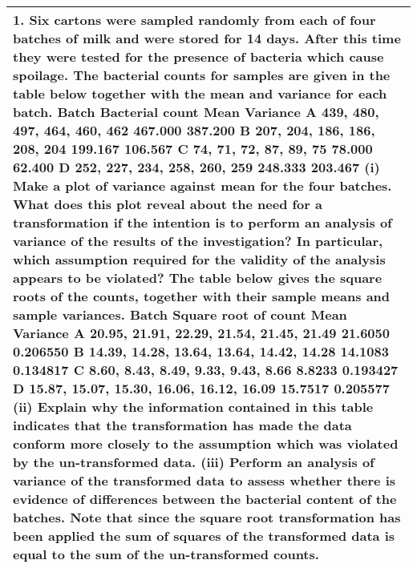 \documentclass[a4paper,12pt]{article}
\begin{document}
\begin{table}[ht!]
 \centering
 \begin{tabular}{|p{15cm}|}
 \hline  
1. Six cartons were sampled randomly from each of four batches of milk and were stored for 14 days. After this time they were tested for the presence of bacteria which cause spoilage. The bacterial counts for samples are given in the table below together with the mean and variance for each batch.
Batch Bacterial count Mean Variance A 439, 480, 497, 464, 460, 462 467.000 387.200 B 207, 204, 186, 186, 208, 204 199.167 106.567 C 74,   71,   72,   87,   89,   75 78.000 62.400 D 252, 227, 234, 258, 260, 259 248.333 203.467
(i) Make a plot of variance against mean for the four batches. What does this plot reveal about the need for a transformation if the intention is to perform an analysis of variance of the results of the investigation? In particular, which assumption required for the validity of the analysis appears to be violated?
The table below gives the square roots of the counts, together with their sample means and sample variances.
Batch Square root of count Mean Variance A 20.95, 21.91, 22.29, 21.54, 21.45, 21.49 21.6050 0.206550 B 14.39, 14.28, 13.64, 13.64, 14.42, 14.28 14.1083 0.134817 C  8.60,   8.43,   8.49,   9.33,   9.43,   8.66 8.8233 0.193427 D 15.87, 15.07, 15.30, 16.06, 16.12, 16.09 15.7517 0.205577
(ii) Explain why the information contained in this table indicates that the transformation has made the data conform more closely to the assumption which was violated by the un-transformed data.
(iii) Perform an analysis of variance of the transformed data to assess whether there is evidence of differences between the bacterial content of the batches.  Note that since the square root transformation has been applied the sum of squares of the transformed data is equal to the sum of the un-transformed counts.
\\ \hline
  \end{tabular}
\end{table}
\end{document}
